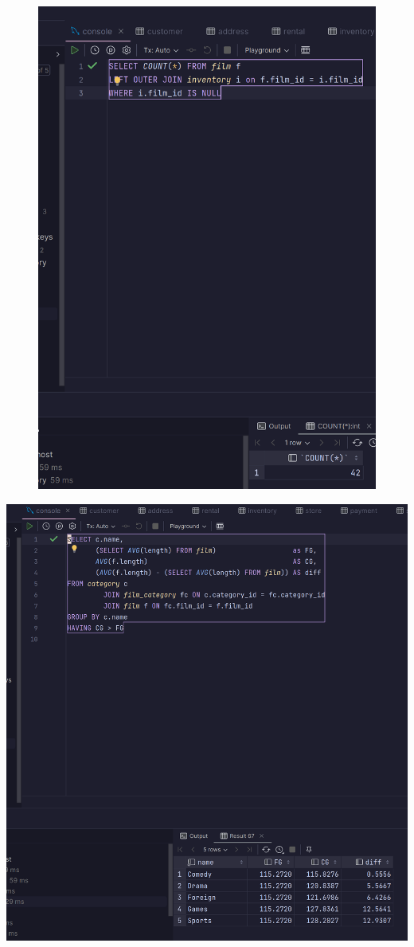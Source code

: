 \documentclass{exam}
\begin{document}
\begin{questions}
\begin{figure}
		\includegraphics[width=\textwidth,height=\textheight,keepaspectratio]{question9}
	\end{figure}
	\question
	\includegraphics[width=\textwidth,height=\textheight,keepaspectratio]{question10}
\end{questions}
\end{document}
